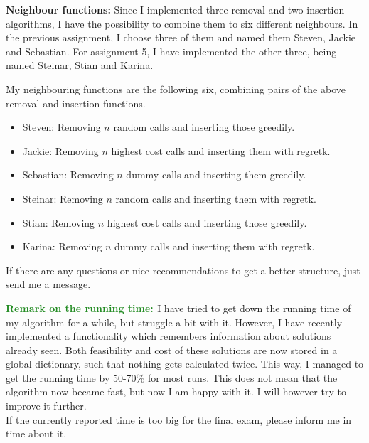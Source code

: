 \documentclass[a4paper,11pt]{article}
\theoremstyle{mytheor}
\begin{document}
\textbf{Neighbour functions: }Since I implemented three removal and two insertion algorithms, I have the possibility to combine them to six different neighbours. In the previous assignment, I choose three of them and named them Steven, Jackie and Sebastian. For assignment 5, I have implemented the other three, being named Steinar, Stian and Karina.\medskip

My neighbouring functions are the following six, combining pairs of the above removal and insertion functions.
\begin{itemize}
\item Steven: Removing $n$ random calls and inserting those greedily.
\item Jackie: Removing $n$ highest cost calls and inserting them with regretk.
\item Sebastian: Removing $n$ dummy calls and inserting them greedily.
\item Steinar: Removing $n$ random calls and inserting them with regretk.
\item Stian: Removing $n$ highest cost calls and inserting those greedily.
\item Karina: Removing $n$ dummy calls and inserting them with regretk.
\end{itemize}

\medskip
If there are any questions or nice recommendations to get a better structure, just send me a message.\medskip

\textbf{\textcolor{ForestGreen}{Remark on the running time: }}I have tried to get down the running time of my algorithm for a while, but struggle a bit with it. However, I have recently implemented a functionality which remembers information about solutions already seen. Both feasibility and cost of these solutions are now stored in a global dictionary, such that nothing gets calculated twice. This way, I managed to get the running time by 50-70\% for most runs. This does not mean that the algorithm now became fast, but now I am happy with it. I will however try to improve it further.\\
If the currently reported time is too big for the final exam, please inform me in time about it.
\end{document}
